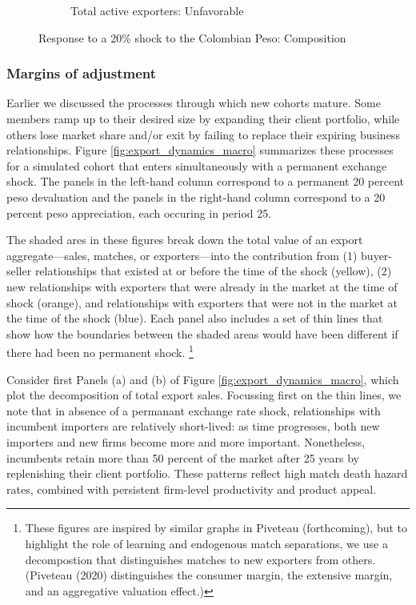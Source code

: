 \documentclass[12pt]{article}
\begin{document}
\begin{figure}[tbp]
\begin{subfigure}[b]{0.45\textwidth}
        \caption{Total active exporters: Unfavorable}
    \end{subfigure}
\caption{Response to a 20\% shock to the Colombian Peso: Composition}
\label{fig:export_dynamics_average}
\end{figure}

\subsubsection{Margins of adjustment}

Earlier we discussed the processes through which new cohorts mature. Some members ramp up to their desired size by expanding their client portfolio, while others lose market share and/or exit by failing to replace their expiring business relationships. Figure \ref{fig:export_dynamics_macro} summarizes these processes for a simulated cohort that enters simultaneously with a permanent exchange shock. The panels in the left-hand column correspond to a permanent 20 percent peso devaluation and the panels in the right-hand column correspond to a 20 percent peso appreciation, each occuring in period 25. 

The shaded ares in these figures break down the total value of an export aggregate---sales, matches, or exporters---into the contribution from (1) buyer-seller relationships that existed at or before the time of the shock (yellow), (2) new relationships with exporters
that were already in the market at the time of shock (orange), and
relationships with exporters that were not in the market at the time of the
shock (blue). Each panel also includes a set of thin lines that show how the boundaries between the shaded areas would have been different if there had been no permanent shock.%
\footnote{%
These figures are inspired by similar graphs in Piveteau (forthcoming), but to
highlight the role of learning and endogenous match separations, we use a
decompostion that distinguishes matches to new exporters from others. (Piveteau (2020) distinguishes the consumer margin, the extensive margin, and
an aggregative valuation effect.)} 

Consider first Panels (a) and (b) of Figure \ref{fig:export_dynamics_macro}, which plot the decomposition of total export sales. Focussing first on the thin lines, we note that in absence of a permanant exchange rate shock, relationships with incumbent importers are relatively short-lived: as time progresses, both new importers and new firms become more and more
important. Nonetheless, incumbents retain more than 50 percent of the market
after 25 years by replenishing their client portfolio. These patterns reflect high match death hazard rates, combined with persistent firm-level productivity and product appeal.
\end{document}
